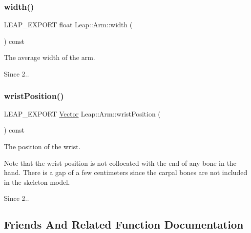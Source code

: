 \subsubsection{\texorpdfstring{width()}{width()}}
{\footnotesize\ttfamily L\+E\+A\+P\+\_\+\+E\+X\+P\+O\+RT float Leap\+::\+Arm\+::width (\begin{DoxyParamCaption}{ }\end{DoxyParamCaption}) const}

The average width of the arm.


\begin{DoxyCodeInclude}
\end{DoxyCodeInclude}


\begin{DoxySince}{Since}
2.. 
\end{DoxySince}
\mbox{\label{class_leap_1_1_arm_a3543639cac98fa4488bd0df2216bba9f}} 
\subsubsection{\texorpdfstring{wrist\+Position()}{wristPosition()}}
{\footnotesize\ttfamily L\+E\+A\+P\+\_\+\+E\+X\+P\+O\+RT \hyperlink{struct_leap_1_1_vector}{Vector} Leap\+::\+Arm\+::wrist\+Position (\begin{DoxyParamCaption}{ }\end{DoxyParamCaption}) const}

The position of the wrist.


\begin{DoxyCodeInclude}
\end{DoxyCodeInclude}


Note that the wrist position is not collocated with the end of any bone in the hand. There is a gap of a few centimeters since the carpal bones are not included in the skeleton model.

\begin{DoxySince}{Since}
2.. 
\end{DoxySince}


\subsection{Friends And Related Function Documentation}
\mbox{\label{class_leap_1_1_arm_a619b9b7c78e6103c73f6519b817abbf5}} 
